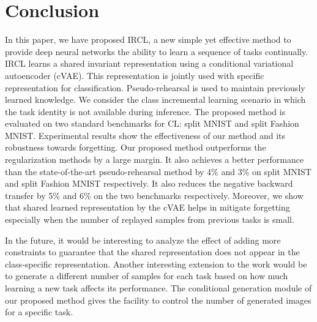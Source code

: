 \documentclass[letterpaper]{article} %
\begin{document}
\section{Conclusion}
In this paper, we have proposed IRCL, a new simple yet effective method to provide deep neural networks the ability to learn a sequence of tasks continually. IRCL learns a shared invariant representation using a conditional variational autoencoder (cVAE). This representation is jointly used with specific representation for classification. Pseudo-rehearsal is used to maintain previously learned knowledge. We consider the class incremental learning scenario in which the task identity is not available during inference. The proposed method is evaluated on two standard benchmarks for CL: split MNIST and split Fashion MNIST. Experimental results show the effectiveness of our method and its robustness towards forgetting. Our proposed method outperforms the regularization methods by a large margin. It also achieves a better performance than the state-of-the-art pseudo-rehearsal method by 4\% and 3\% on split MNIST and split Fashion MNIST respectively. It also reduces the negative backward transfer by 5\%  and 6\% on the two benchmarks respectively.
Moreover, we show that shared learned representation by the cVAE helps in mitigate forgetting especially when the number of replayed samples from previous tasks is small.

In the future, it would be interesting to analyze the effect of adding more constraints to guarantee that the shared representation does not appear in the class-specific representation. Another interesting extension to the work would be to generate a different number of samples for each task based on how much learning a new task affects its performance. The conditional generation module of our proposed method gives the facility to control the number of generated images for a specific task.
\end{document}
